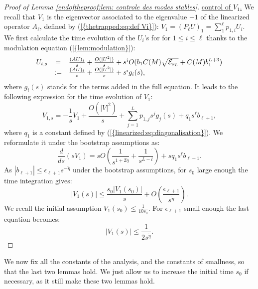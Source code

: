 \documentclass[11pt,a4paper,reqno]{amsart}
\theoremstyle{remark}
\numberwithin{equation}{section}
\begin{document}
\begin{proof}[Proof of Lemma \ref{endoftheproof:lem: controle des modes stables}]
\underline{control of $V_1$.} We recall that $V_1$ is the eigenvector associated to the eigenvalue $-1$ of the linearized operator $A_{\ell}$, defined by {{\rm (\ref{{thetrapped:eq:def Vi}})}}: $V_1=(P_{\ell}U)_1=\sum_1^{\ell}p_{1,i}U_i$. We first calculate the time evolution of the $U_i$'s for for $1\leq i \leq \ell$ thanks to the modulation equation {{\rm (\ref{{lem:modulation}})}}:
$$
\begin{array}{r c l}  \label{endoftheproof:eq:eq devolution des Ui}
U_{i,s}&=&\frac{(AU)_i}{s}+\frac{O(|U^2|)}{s}+s^i O(b_1C(M)\sqrt{\mathcal{E}_{s_L}}+C(M)b_1^{L+3})\\
&:=&\frac{(AU)_i}{s}+\frac{O(|U^2|)}{s}+s^i g_i(s),
\end{array}
$$
where $g_i(s)$ stands for the terms added in the full equation. It leads to the following expression for the time evolution of $V_1$:
\begin{equation} 
V_{1,s}=-\frac{1}{s}V_1 +\frac{O(|V|^2)}{s}+\sum_{j=1}^L p_{1,j} s^j g_j(s)+q_1s^{\ell}b_{\ell+1},
\end{equation}
where $q_1$ is a constant defined by {{\rm (\ref{{linearized:eq:diagonalisation}})}}. We reformulate it under the bootstrap assumptions as:
$$
\frac{d}{ds} (sV_1)=sO\left( \frac{1}{s^{1+2\tilde{\eta}}}+\frac{1}{s^{L-l}}\right)+sq_1s^{\ell}b_{\ell+1} .
$$
As $|b_{\ell+1} |\leq \epsilon_{\ell+1}s^{-\tilde{\eta}}$ under the bootstrap assumptions, for $s_0$ large enough the time integration gives:
$$
|V_1(s)|\leq \frac{s_0|V_1(s_0)|}{s}+O\left( \frac{\epsilon_{\ell+1}}{s^{\tilde{\eta}}} \right) .
$$
We recall the initial assumption $V_1(s_0)\leq \frac{1}{10s_0}$. For $\epsilon_{\ell+1}$ small enough the last equation becomes:
$$
|V_1(s)|\leq \frac{1}{2s^{\tilde{\eta}}} .
$$
\end{proof}

We now fix all the constants of the analysis, and the constants of smallness, so that the last two lemmas hold. We just allow us to increase the initial time $s_0$ if necessary, as it still make these two lemmas hold.
\end{document}
